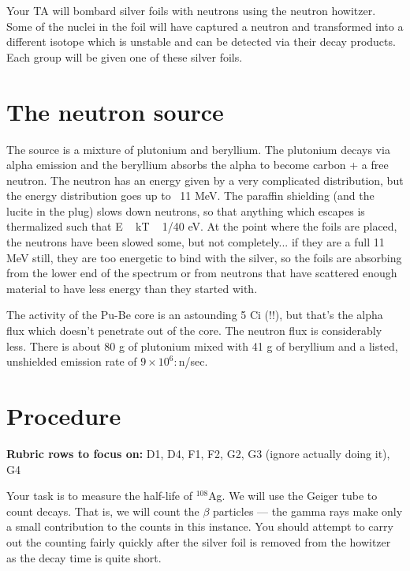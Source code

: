 Your TA will bombard silver foils with neutrons using the neutron howitzer. Some of the
nuclei in the foil will have captured a neutron and transformed into a different isotope
which is unstable and can be detected via their decay products. Each group will be given
one of these silver foils.

\section{The neutron source}

The source is a mixture of plutonium and beryllium. The plutonium decays via alpha emission and the beryllium absorbs the alpha to become carbon + a free neutron. The neutron has an energy given by a very complicated distribution, but the energy distribution goes up to ~11 MeV. The paraffin shielding (and the lucite in the plug) slows down neutrons, so that anything which escapes is thermalized such that E ~ kT ~ 1/40 eV. At the point where the foils are placed, the neutrons have been slowed some, but not completely... if they are a full 11 MeV still, they are too energetic to bind with the silver, so the foils are absorbing from the lower end of the spectrum or from neutrons that have scattered enough material to have less energy than they started with.

The activity of the Pu-Be core is an astounding 5 Ci (!!), but that's the alpha flux which doesn't penetrate out of the core. The neutron flux is considerably less. There is about 80 g of plutonium mixed with 41 g of beryllium and a listed, unshielded emission rate of $9 \times 10^6:$n/sec.

\section{Procedure}

\textbf{Rubric rows to focus on:} D1, D4, F1, F2, G2, G3 (ignore actually doing it), G4

Your task is to measure the half-life of $^{108}$Ag. We will use the Geiger tube to count
decays. That is, we will count the $\beta$ particles --- the gamma rays make only a small
contribution to the counts in this instance. You should attempt to carry out the counting
fairly quickly after the silver foil is removed from the howitzer as the decay time is quite
short.

